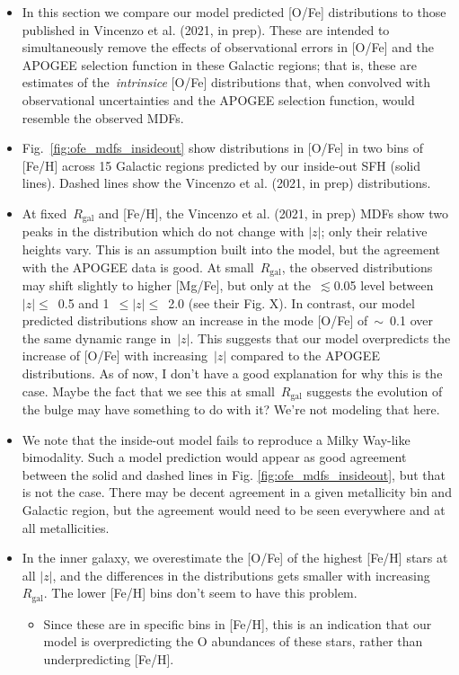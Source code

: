 \documentclass[fleqn, usenatbib]{mnras}
\begin{document}
\begin{itemize} 
	\item In this section we compare our model predicted [O/Fe] distributions 
	to those published in Vincenzo et al. (2021, in prep). These are intended 
	to simultaneously remove the effects of observational errors in [O/Fe] 
	and the APOGEE selection function in these Galactic regions; that is, 
	these are estimates of the~\textit{intrinsice} [O/Fe] distributions that, 
	when convolved with observational uncertainties and the APOGEE selection 
	function, would resemble the observed MDFs. 

	\item Fig.~\ref{fig:ofe_mdfs_insideout} show distributions in [O/Fe] in 
	two bins of [Fe/H] across 15 Galactic regions predicted by our inside-out 
	SFH (solid lines). Dashed lines show the Vincenzo et al. (2021, in prep) 
	distributions. 

	\item At fixed~$R_\text{gal}$ and [Fe/H], the Vincenzo et al. (2021, 
	in prep) MDFs show two peaks in the distribution which do not change with 
	$\left|z\right|$; only their relative heights vary. This is an assumption 
	built into the model, but the agreement with the APOGEE data is good. 
	At small~$R_\text{gal}$, the observed distributions may shift slightly to 
	higher [Mg/Fe], but only at the~$\lesssim$0.05 level between 
	$\left|z\right|\leq$~0.5 and 1~$\leq\left|z\right|\leq$~2.0 (see their Fig. 
	X). In contrast, our model predicted distributions show an increase in the 
	mode [O/Fe] of~$\sim$~0.1 over the same dynamic range in~$\left|z\right|$. 
	This suggests that our model overpredicts the increase of [O/Fe] with 
	increasing~$\left|z\right|$ compared to the APOGEE distributions. 
	{\color{red} As of now, I don't have a good explanation for why this is 
	the case. Maybe the fact that we see this at small~$R_\text{gal}$ suggests 
	the evolution of the bulge may have something to do with it? We're not 
	modeling that here.} 

	\item We note that the inside-out model fails to reproduce a Milky 
	Way-like bimodality. Such a model prediction would appear as good 
	agreement between the solid and dashed lines in Fig. 
	\ref{fig:ofe_mdfs_insideout}, but that is not the case. There may be 
	decent agreement in a given metallicity bin and Galactic region, but the 
	agreement would need to be seen everywhere and at all metallicities. 

	\item In the inner galaxy, we overestimate the [O/Fe] of the highest 
	[Fe/H] stars at all $\left|z\right|$, and the differences in the 
	distributions gets smaller with increasing~$R_\text{gal}$. The lower 
	[Fe/H] bins don't seem to have this problem. 
	\begin{itemize} 
		\item Since these are in specific bins in [Fe/H], this is an 
		indication that our model is overpredicting the O abundances of these 
		stars, rather than underpredicting [Fe/H]. 


\end{itemize}
\end{itemize}
\end{document}
